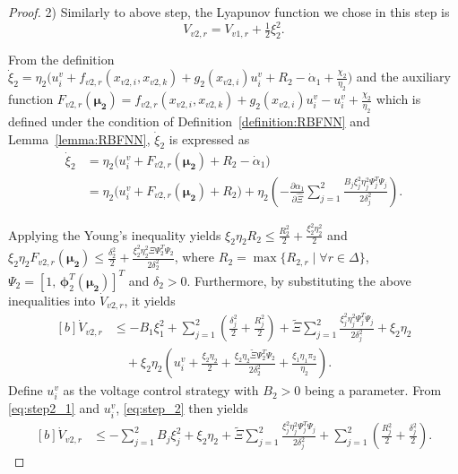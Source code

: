 \documentclass[]{interact}
\theoremstyle{plain}%
\theoremstyle{definition}
\theoremstyle{remark}
\begin{document}
\begin{proof}
2) Similarly to above step, the Lyapunov function \citep{Zhongqiang2023} we chose in this step is 
\begin{equation}
V_{v2,r} = V_{v1,r} + \tfrac{1}{2}\xi_2^2.
\end{equation}

From the definition $\dot{\xi}_2 = \eta_2 \bigg( u_i^v + f_{v2,r}(x_{v2,i}, x_{v2,k}) + g_2(x_{v2,i}) u_i^v + R_2 - \dot{\alpha}_{1} + \frac{\chi_2}{\eta_2} \bigg)$ and the auxiliary function $F_{v2,r}(\boldsymbol{\mu_2}) = f_{v2,r}(x_{v2,i}, x_{v2,k}) + g_2(x_{v2,i}) u_i^v - u_i^v + \frac{\chi_2}{\eta_2}$ which is defined under the condition of Definition~\ref{definition:RBFNN} and Lemma~\ref{lemma:RBFNN}, $\dot{\xi}_2$ is expressed as   
\begin{equation}
\begin{aligned}
\dot{\xi}_2
&= \eta_2 \big( u_i^v + F_{v2,r}(\boldsymbol{\mu_2}) + R_2 - \dot{\alpha}_1 \big) \\
&= \eta_2 \big( u_i^v + F_{v2,r}(\boldsymbol{\mu_2}) + R_2 \big) + \eta_2 \left(
- \frac{\partial \alpha_1}{\partial \hat{\Xi}}
\sum_{j=1}^{2}
\frac{B_j \xi_j^{2} \eta_j^{2} \boldsymbol{\varPsi}_j^{T} \boldsymbol{\varPsi}_j}{2\delta_j^{2}}
\right).
\end{aligned}
\end{equation}
 
Applying the Young's inequality yields   
$\xi_2 \eta_2 R_2
\le \frac{R_2^{2}}{2}
+ \frac{\xi_2^{2} \eta_2^{2}}{2}$ and $\xi_2 \eta_2 F_{v2,r}(\boldsymbol{\mu_2}) \le \frac{\delta_2^{2}}{2} + \frac{\xi_2^{2} \eta_2^{2} \Xi \boldsymbol{\varPsi}_2^{T} \boldsymbol{\varPsi}_2}{2\delta_2^{2}}$, where $R_2 = \max\{ R_{2,r} \mid \forall r\in\Delta \}$, $\boldsymbol{\varPsi}_2 = [1,\,\boldsymbol{\phi}_2^T(\boldsymbol{\mu_2})]^T$ and $\delta_2>0$. Furthermore, by substituting the above inequalities into
 $\dot{V}_{v2,r}$, it yields 
\begin{equation}
\begin{aligned}[b]
\label{eq:step2_1}
\dot{V}_{v2,r} &\le -B_1 \xi_1^2  
+ \sum_{j=1}^{2} \left( \frac{\delta_j^2}{2} + \frac{R_j^2}{2} \right) + \tilde{\Xi} \sum_{j=1}^{2} 
\frac{\xi_j^2 \eta_j^2 \boldsymbol{\varPsi}_j^T \boldsymbol{\varPsi}_j}{2\delta_j^2}
+ \xi_2 \eta_2 \\
&\quad + \xi_2 \eta_2 \left( 
u_i^v + \frac{\xi_2 \eta_2}{2} 
+ \frac{\xi_2 \eta_2 \tilde{\Xi} \boldsymbol{\varPsi}_2^T \boldsymbol{\varPsi}_2}{2 \delta_2^2}
+ \frac{\xi_1\eta_1\pi_2}{\eta_2}
\right).
\end{aligned}
\end{equation}
Define $u_i^v$ as the voltage control strategy with $B_2>0$ being a parameter. 
From \eqref{eq:step2_1} and $u_i^v$, \eqref{eq:step_2} then yields 
\begin{equation}
\label{eq:L_V}
\begin{aligned}[b]
\dot{V}_{v2,r}
&\le -\sum_{j=1}^{2}B_j \xi_j^2
+ \xi_2\eta_2  + \tilde{\Xi}\sum_{j=1}^{2}
\frac{\xi_j^2 \eta_j^2 \boldsymbol{\varPsi}_j^T \boldsymbol{\varPsi}_j}{2\delta_j^2}
+ \sum_{j=1}^{2}\left( \frac{R_j^2}{2} + \frac{\delta_j^2}{2} \right).
\end{aligned}
\end{equation}


\end{proof}
\end{document}

